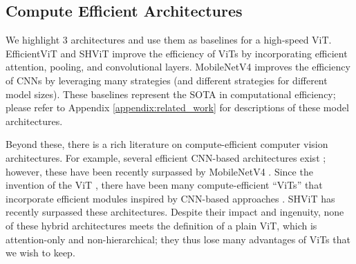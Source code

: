 \subsection{Compute Efficient Architectures}\label{sec:compute-efficient}

We highlight $3$ architectures and use them as baselines for a high-speed ViT.  EfficientViT \cite{cai2023efficientvit} and  SHViT \cite{yun2024shvit} improve the efficiency of ViTs by incorporating efficient attention, pooling, and convolutional layers.  MobileNetV4 \cite{qin2025mobilenetv4} improves the efficiency of CNNs by leveraging many strategies (and different strategies for different model sizes). These baselines represent the SOTA in computational efficiency; please refer to Appendix \ref{appendix:related_work} for descriptions of these model architectures.



Beyond these, there is a rich literature on compute-efficient computer vision architectures. For example, several efficient CNN-based architectures exist \cite{howard2017mobilenets, sandler2018mobilenetv2, howard2019searching, han2020ghostnet, tan2019mnasnet, vasu2023mobileone}; however, these have been recently surpassed by MobileNetV4 \cite{qin2025mobilenetv4}. Since the invention of the ViT \cite{dosovitskiy2021an}, there have been many compute-efficient ``ViTs'' that incorporate efficient modules inspired by CNN-based approaches \cite{vasufastvit2023, mehta2021mobilevit, mehta2022separable, li2023rethinking, pan2022edgevits, chen2022mobile, li2022efficientformer}. SHViT \cite{yun2024shvit} has recently surpassed these architectures. Despite their impact and ingenuity, none of these hybrid architectures meets the definition of a plain ViT, which is attention-only and non-hierarchical; they thus lose many advantages of ViTs that we wish to keep.